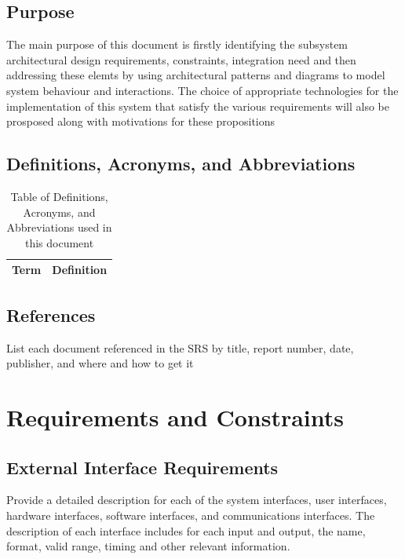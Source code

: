 \documentclass{article}
\begin{document}
		\subsection{Purpose}\label{subsec:purpose}
			The main purpose of this document is firstly identifying the subsystem architectural design requirements, constraints, integration need  and then addressing these elemts by using architectural patterns and diagrams to model system behaviour and interactions. The choice of appropriate technologies for the implementation of this system that satisfy the various requirements will also be prosposed along with motivations for these propositions 
				
		\subsection{Definitions, Acronyms, and Abbreviations}\label{subsec:daa}
			\begin{table}[h!]
				\centering
				\caption{Table of Definitions, Acronyms, and Abbreviations used in this document}
				\label{tab: Table 1}
				\begin{tabular}{| m{4cm} | m{12cm} |}
					\hline
					\textbf{Term} & \textbf{Definition} \\
					\hline
					\hline
					
				\end{tabular}
			\end{table}
	
		\subsection{References}\label{subsec:references}
		List each document referenced in the SRS by title, report number, date, publisher, and where and how to get it
		
	\section{Requirements and Constraints}\label{sec:requirements}
			\subsection{External Interface Requirements}\label{subsec:external}
				Provide a detailed description for each of the system interfaces, user interfaces, hardware interfaces, software interfaces, and communications interfaces. The description of each interface includes for each input and output, the name, format, valid range, timing and other relevant information.
\end{document}
